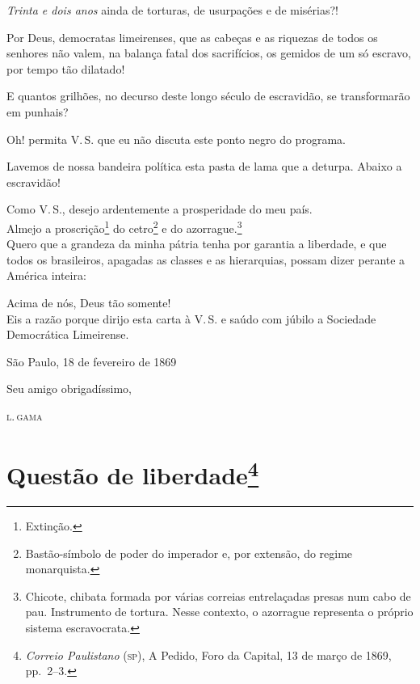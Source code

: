 \emph{Trinta e dois anos} ainda de torturas, de usurpações e de
misérias?!

Por Deus, democratas limeirenses, que as cabeças e as riquezas de todos
os senhores não valem, na balança fatal dos sacrifícios, os gemidos de
um só escravo, por tempo tão dilatado!

E quantos grilhões, no decurso deste longo século de escravidão, se
transformarão em punhais?

Oh! permita V.\,S. que eu não discuta este ponto negro do programa.

Lavemos de nossa bandeira política esta pasta de lama que a deturpa.
Abaixo a escravidão!

\noindent\dotfill

Como V.\,S., desejo ardentemente a prosperidade do meu país.\\
Almejo a proscrição\footnote{Extinção.} do cetro\footnote{
  Bastão-símbolo de poder do imperador e, por extensão, do regime
  monarquista.} e do azorrague.\footnote{Chicote, chibata formada por
  várias correias entrelaçadas presas num cabo de pau. Instrumento de
  tortura. Nesse contexto, o azorrague representa o próprio sistema
  escravocrata.}\\
Quero que a grandeza da minha pátria tenha por garantia a liberdade, e
que todos os brasileiros, apagadas as classes e as hierarquias, possam
dizer perante a América inteira:

Acima de nós, Deus tão somente!\\
Eis a razão porque dirijo esta carta à V.\,S. e saúdo com júbilo a
Sociedade Democrática Limeirense.

\begin{flushright}
São Paulo, 18 de fevereiro de 1869

Seu amigo obrigadíssimo,

\textsc{l.\,gama}
\end{flushright}

\chapter{Questão de liberdade\footnote{\emph{Correio Paulistano} (\textsc{sp}),
  A Pedido, Foro da Capital, 13 de março de 1869, pp.~2--3.}}

